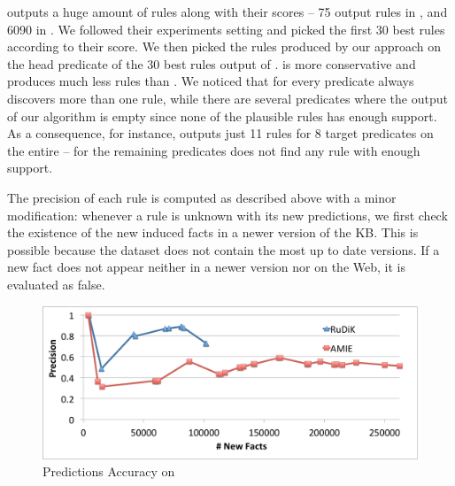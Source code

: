 \amie outputs a huge amount of rules along with their scores -- 75 output rules in \yago, and 6090 in \dbpedia. We followed their experiments setting and picked the first 30 best rules according to their score. We then picked the rules produced by our approach on the head predicate of the 30 best rules output of \amie. \krd is more conservative and produces much less rules than \amie. We noticed that for every predicate \amie always discovers more than one rule, while there are several predicates where the output of our algorithm is empty since none of the plausible rules has enough support. As a consequence, for instance, \krd outputs just 11 rules for 8 target predicates on the entire \yago -- for the remaining predicates \krd does not find any rule with enough support.

The precision of each rule is computed as described above with a minor modification: whenever a rule is unknown with its new predictions, we first check the existence of the new induced facts in a newer version of the KB. This is possible because the \amie dataset does not contain the most up to date versions. If a new fact does not appear neither in a newer version nor on the Web, it is evaluated as false.

\begin{figure}[t]
	\centering
	\includegraphics[width=.7\columnwidth]{include/figure/vsAmieYago.pdf}
	\caption{Predictions Accuracy on \yago}
	\label{fig:vs_amie_yago}
\end{figure}

